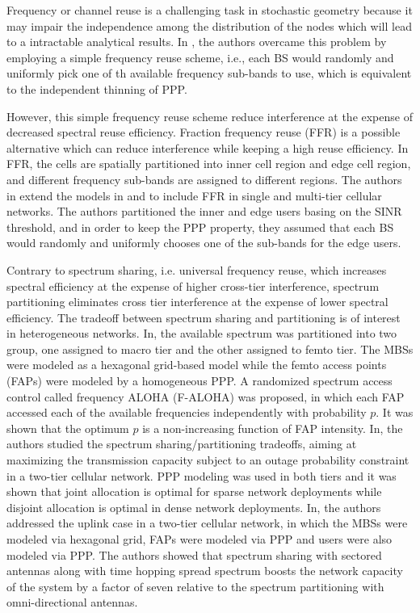 \documentclass[a4paper,twocolumn]{IEEEtran}
\begin{document}
Frequency or channel reuse is a challenging task in stochastic geometry because it may impair the independence among the distribution of the nodes which will lead to a intractable analytical results. In \cite{Andrews2011TC}, the authors overcame this problem by employing a simple frequency reuse scheme, i.e., each BS would randomly and uniformly pick one of th available frequency sub-bands to use, which is equivalent to the independent thinning of PPP. 

However, this simple frequency reuse scheme reduce interference at the expense of decreased spectral reuse efficiency. Fraction frequency reuse (FFR) is a possible alternative which can reduce interference while keeping a high reuse efficiency\cite{Novlan2011TWC}\cite{Novlan2012TC}. In FFR, the cells are spatially partitioned into inner cell region and edge cell region, and different frequency sub-bands are assigned to different regions. The authors in \cite{Novlan2011TWC}\cite{Novlan2012TC} extend the models in \cite{Andrews2011TC} and \cite{Dhillon2012JSAC} to include FFR in single and multi-tier cellular networks. The authors partitioned the inner and edge users basing on the SINR threshold, and in order to keep the PPP property, they assumed that each BS would randomly and uniformly chooses one of the sub-bands for the edge users.

Contrary to spectrum sharing, i.e. universal frequency reuse, which increases spectral efficiency at the expense of higher cross-tier interference, spectrum partitioning eliminates cross tier interference at the expense of lower spectral efficiency. The tradeoff between spectrum sharing and partitioning is of interest in heterogeneous networks. In\cite{Chandrasekhar2009TC}, the available spectrum was partitioned into two group, one assigned to macro tier and the other assigned to femto tier. The MBSs were modeled as a hexagonal grid-based model while the femto access points (FAPs) were modeled by a homogeneous PPP. A randomized spectrum access control called frequency ALOHA (F-ALOHA) was proposed, in which each FAP accessed each of the available frequencies independently with probability $p$. It was shown that the optimum $p$ is a non-increasing function of FAP intensity. In\cite{Cheung2012JSAC}, the authors studied the spectrum sharing/partitioning tradeoffs, aiming at maximizing the transmission capacity subject to an outage probability constraint in a two-tier cellular network. PPP modeling was used in both tiers and it was shown that joint allocation is optimal for sparse network deployments while disjoint allocation is optimal in dense network deployments. In\cite{Chandr2009TWC}, the authors addressed the uplink case in a two-tier cellular network, in which the MBSs were modeled via hexagonal grid, FAPs were modeled via PPP and users were also modeled via PPP. The authors showed that spectrum sharing with sectored antennas along with time hopping spread spectrum boosts the network capacity of the system by a factor of seven relative to the spectrum partitioning with omni-directional antennas.   
\end{document}
